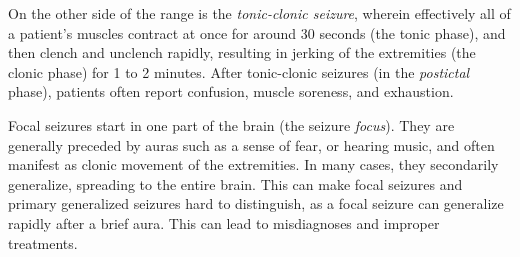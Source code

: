 On the other side of the range is the \textit{tonic-clonic seizure}, wherein effectively all of a patient's muscles contract at once for around 30 seconds (the tonic phase), and then clench and unclench rapidly, resulting in jerking of the extremities (the clonic phase) for 1 to 2 minutes.
After tonic-clonic seizures (in the \textit{postictal} phase), patients often report confusion, muscle soreness, and exhaustion.

Focal seizures start in one part of the brain (the seizure \textit{focus}).
They are generally preceded by auras such as a sense of fear, or hearing music, and often manifest as clonic movement of the extremities.
In many cases, they secondarily generalize, spreading to the entire brain.
This can make focal seizures and primary generalized seizures hard to distinguish, as a focal seizure can generalize rapidly after a brief aura.
This can lead to misdiagnoses and improper treatments.

